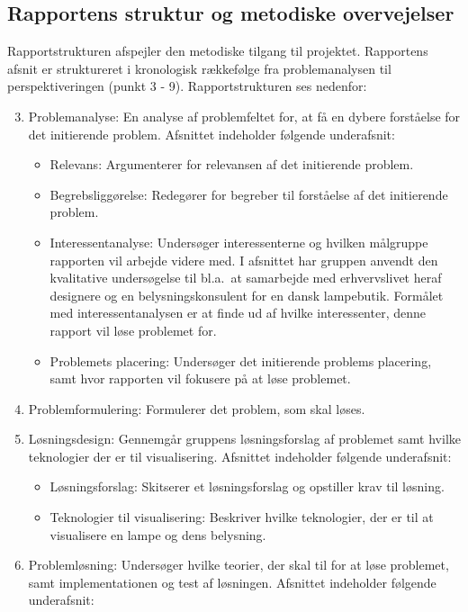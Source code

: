 \subsection{Rapportens struktur og metodiske overvejelser}
Rapportstrukturen afspejler den metodiske tilgang til projektet. Rapportens afsnit er struktureret i kronologisk rækkefølge fra problemanalysen til perspektiveringen (punkt 3 - 9). 
Rapportstrukturen ses nedenfor: 
\begin{enumerate}
\setcounter{enumi}{2}
\item Problemanalyse: En analyse af problemfeltet for, at få en dybere forståelse for det initierende problem. Afsnittet indeholder følgende underafsnit:
  \begin{itemize}
    \item Relevans: Argumenterer for relevansen af det initierende problem.
    \item Begrebsliggørelse: Redegører for begreber til forståelse af det initierende problem.
    \item Interessentanalyse: Undersøger interessenterne og hvilken målgruppe rapporten vil arbejde videre med. I afsnittet har gruppen anvendt den kvalitative undersøgelse til bl.a.\ at samarbejde med erhvervslivet heraf designere og en belysningskonsulent for en dansk lampebutik. Formålet med interessentanalysen er at finde ud af hvilke interessenter, denne rapport vil løse problemet for.
    \item Problemets placering: Undersøger det initierende problems placering, samt hvor rapporten vil fokusere på at løse problemet.
  \end{itemize}
\item Problemformulering: Formulerer det problem, som skal løses.
\item Løsningsdesign: Gennemgår gruppens løsningsforslag af problemet samt hvilke teknologier der er til visualisering. Afsnittet indeholder følgende underafsnit: 
  \begin{itemize}
    \item Løsningsforslag: Skitserer et løsningsforslag og opstiller krav til løsning.
    \item Teknologier til visualisering: Beskriver hvilke teknologier, der er til at visualisere en lampe og dens belysning.
  \end{itemize}
\item Problemløsning: Undersøger hvilke teorier, der skal til for at løse problemet, samt implementationen og test af løsningen. Afsnittet indeholder følgende underafsnit:

\end{enumerate}
